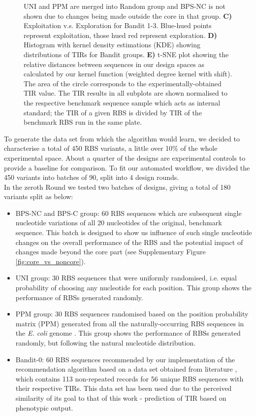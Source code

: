 \documentclass{scrartcl}[2013/05/29]%
\newcommand{\mengyan}[1]{\textcolor{magenta}{#1}}
\begin{document}
\begin{figure}[!ht]
{    UNI and PPM are merged into Random group and BPS-NC is not shown due to changes being made outside the core in that group.
    \textbf{C)} Exploitation v.s. Exploration for Bandit 1-3. Blue-hued points represent exploitation, those hued red represent exploration.
    \textbf{D)} Histogram with kernel density estimations (KDE) showing distributions of TIRs for Bandit groups.
    \textbf{E)} t-SNE plot showing the relative distances between sequences in our design spaces as calculated by our kernel function (weighted degree kernel with shift).
    The area of the circle corresponds to the experimentally-obtained TIR value.
    The TIR results in all subplots are shown normalised to the respective benchmark sequence sample which acts as internal standard; the TIR of a given RBS is divided by TIR of the benchmark RBS run in the same plate. }
    \label{fig: Swarmplot and Quantplot}
\end{figure}

To generate the data set from which the algorithm would learn, we decided to characterise a total of 450 RBS variants, a little over 10\% of the whole experimental space. 
About a quarter of the designs are experimental controls to provide a baseline for comparison.
To fit our automated workflow, we divided the 450 variants into batches of 90, split into 4 design rounds.\\

In the zeroth Round we tested two batches of designs, giving a total of 180 variants split as below:

\begin{itemize}
    \item BPS-NC and BPS-C group: 60 RBS sequences which are subsequent single nucleotide variations of all 20 nucleotides of the original, benchmark sequence. This batch is designed to show us influence of such single nucleotide changes on the overall performance of the RBS and the potential impact of changes made beyond the core part (see Supplementary Figure \ref{fig:core_vs_noncore}).
    \item UNI group: 30 RBS sequences that were uniformly randomised, i.e. equal probability of choosing any nucleotide for each position. This group shows the performance of RBSs generated randomly.
    \item PPM group: 30 RBS sequences randomised based on the position probability matrix (PPM) generated from all the naturally-occurring RBS sequences in  the \emph{E. coli} genome \cite{barrick1994quantitative}. This group shows the performance of RBSs generated randomly, but following the natural nucleotide distribution.
    \item Bandit-0: 60 RBS sequences recommended by our implementation of the recommendation algorithm based on a data set obtained from literature \cite{jervis2018machine}, which contains 113 non-repeated records for 56 unique RBS sequences with their respective TIRs.
    This data set has been used due to the perceived similarity of its goal to that of this work - prediction of TIR based on phenotypic output.
\end{itemize}
\end{document}
